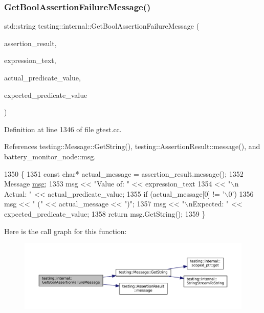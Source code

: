 \subsubsection{\texorpdfstring{Get\+Bool\+Assertion\+Failure\+Message()}{GetBoolAssertionFailureMessage()}}
{\footnotesize\ttfamily std\+::string testing\+::internal\+::\+Get\+Bool\+Assertion\+Failure\+Message (\begin{DoxyParamCaption}\item[{const \hyperlink{classtesting_1_1AssertionResult}{Assertion\+Result} \&}]{assertion\+\_\+result,  }\item[{const char $\ast$}]{expression\+\_\+text,  }\item[{const char $\ast$}]{actual\+\_\+predicate\+\_\+value,  }\item[{const char $\ast$}]{expected\+\_\+predicate\+\_\+value }\end{DoxyParamCaption})}



Definition at line 1346 of file gtest.\+cc.



References testing\+::\+Message\+::\+Get\+String(), testing\+::\+Assertion\+Result\+::message(), and battery\+\_\+monitor\+\_\+node\+::msg.


\begin{DoxyCode}
1350                                           \{
1351   \textcolor{keyword}{const} \textcolor{keywordtype}{char}* actual\_message = assertion\_result.message();
1352   Message \hyperlink{namespacebattery__monitor__node_ab1920c64448816edd4064e494275fdff}{msg};
1353   msg << \textcolor{stringliteral}{"Value of: "} << expression\_text
1354       << \textcolor{stringliteral}{"\(\backslash\)n  Actual: "} << actual\_predicate\_value;
1355   \textcolor{keywordflow}{if} (actual\_message[0] != \textcolor{charliteral}{'\(\backslash\)0'})
1356     msg << \textcolor{stringliteral}{" ("} << actual\_message << \textcolor{stringliteral}{")"};
1357   msg << \textcolor{stringliteral}{"\(\backslash\)nExpected: "} << expected\_predicate\_value;
1358   \textcolor{keywordflow}{return} msg.GetString();
1359 \}
\end{DoxyCode}
Here is the call graph for this function\+:
\nopagebreak
\begin{figure}[H]
\begin{center}
\leavevmode
\includegraphics[width=350pt]{namespacetesting_1_1internal_a5fd6e5dc9eb20ab3c3a80e24d89dfac6_cgraph}
\end{center}
\end{figure}
\mbox{\label{namespacetesting_1_1internal_a374156401da17704099d0c33fa53adfb}} 
